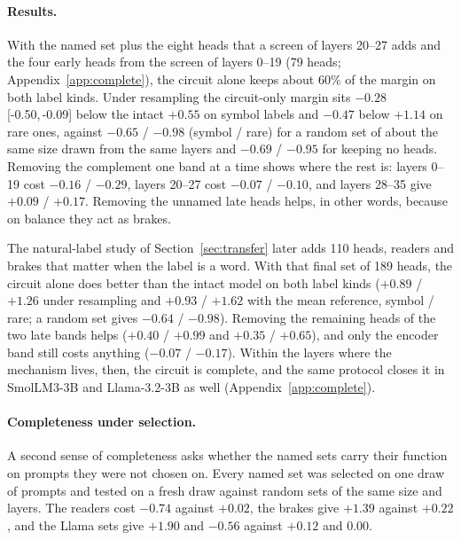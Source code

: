\documentclass{article}
\newcommand{\ci}[2]{[#1,\,#2]}
\begin{document}
\paragraph{Results.} With the named set plus the eight heads that a screen of layers 20--27 adds and the four early heads from the screen of layers 0--19 (79 heads; Appendix~\ref{app:complete}), the circuit alone keeps about 60\% of the margin on both label kinds. Under resampling the circuit-only margin sits $-0.28$ \ci{-0.50}{-0.09} below the intact $+0.55$ on symbol labels and $-0.47$ below $+1.14$ on rare ones, against $-0.65$ / $-0.98$ (symbol / rare) for a random set of about the same size drawn from the same layers and $-0.69$ / $-0.95$ for keeping no heads. Removing the complement one band at a time shows where the rest is: layers 0--19 cost $-0.16$ / $-0.29$, layers 20--27 cost $-0.07$ / $-0.10$, and layers 28--35 give $+0.09$ / $+0.17$. Removing the unnamed late heads helps, in other words, because on balance they act as brakes.

The natural-label study of Section~\ref{sec:transfer} later adds 110 heads, readers and brakes that matter when the label is a word. With that final set of 189 heads, the circuit alone does better than the intact model on both label kinds ($+0.89$ / $+1.26$ under resampling and $+0.93$ / $+1.62$ with the mean reference, symbol / rare; a random set gives $-0.64$ / $-0.98$). Removing the remaining heads of the two late bands helps ($+0.40$ / $+0.99$ and $+0.35$ / $+0.65$), and only the encoder band still costs anything ($-0.07$ / $-0.17$). Within the layers where the mechanism lives, then, the circuit is complete, and the same protocol closes it in SmolLM3-3B and Llama-3.2-3B as well (Appendix~\ref{app:complete}).

\paragraph{Completeness under selection.} A second sense of completeness asks whether the named sets carry their function on prompts they were not chosen on. Every named set was selected on one draw of prompts and tested on a fresh draw against random sets of the same size and layers. The readers cost $-0.74$ against $+0.02$, the brakes give $+1.39$ against $+0.22$, and the Llama sets give $+1.90$ and $-0.56$ against $+0.12$ and $0.00$.
\end{document}
